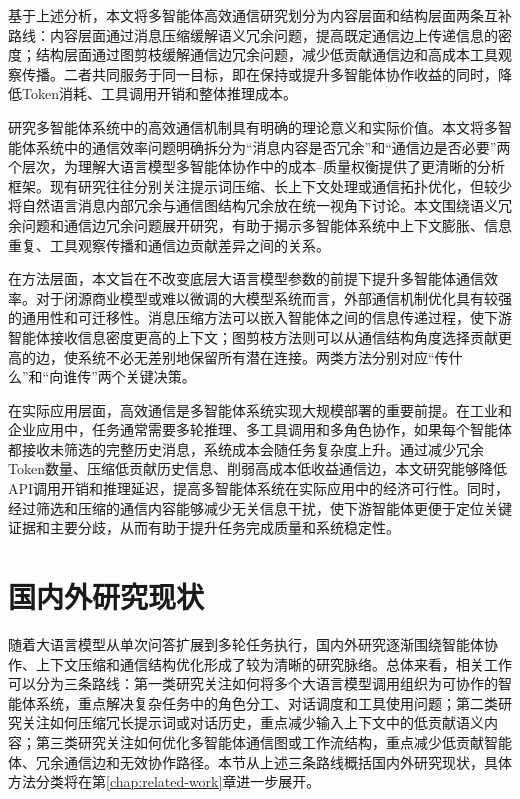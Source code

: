 基于上述分析，本文将多智能体高效通信研究划分为内容层面和结构层面两条互补路线：内容层面通过消息压缩缓解语义冗余问题，提高既定通信边上传递信息的密度；结构层面通过图剪枝缓解通信边冗余问题，减少低贡献通信边和高成本工具观察传播。二者共同服务于同一目标，即在保持或提升多智能体协作收益的同时，降低Token消耗、工具调用开销和整体推理成本。

研究多智能体系统中的高效通信机制具有明确的理论意义和实际价值。本文将多智能体系统中的通信效率问题明确拆分为“消息内容是否冗余”和“通信边是否必要”两个层次，为理解大语言模型多智能体协作中的成本--质量权衡提供了更清晰的分析框架。现有研究往往分别关注提示词压缩、长上下文处理或通信拓扑优化，但较少将自然语言消息内部冗余与通信图结构冗余放在统一视角下讨论。本文围绕语义冗余问题和通信边冗余问题展开研究，有助于揭示多智能体系统中上下文膨胀、信息重复、工具观察传播和通信边贡献差异之间的关系。

在方法层面，本文旨在不改变底层大语言模型参数的前提下提升多智能体通信效率。对于闭源商业模型或难以微调的大模型系统而言，外部通信机制优化具有较强的通用性和可迁移性。消息压缩方法可以嵌入智能体之间的信息传递过程，使下游智能体接收信息密度更高的上下文；图剪枝方法则可以从通信结构角度选择贡献更高的边，使系统不必无差别地保留所有潜在连接。两类方法分别对应“传什么”和“向谁传”两个关键决策。

在实际应用层面，高效通信是多智能体系统实现大规模部署的重要前提。在工业和企业应用中，任务通常需要多轮推理、多工具调用和多角色协作，如果每个智能体都接收未筛选的完整历史消息，系统成本会随任务复杂度上升。通过减少冗余Token数量、压缩低贡献历史信息、削弱高成本低收益通信边，本文研究能够降低API调用开销和推理延迟，提高多智能体系统在实际应用中的经济可行性。同时，经过筛选和压缩的通信内容能够减少无关信息干扰，使下游智能体更便于定位关键证据和主要分歧，从而有助于提升任务完成质量和系统稳定性。

\section{国内外研究现状}

随着大语言模型从单次问答扩展到多轮任务执行，国内外研究逐渐围绕智能体协作、上下文压缩和通信结构优化形成了较为清晰的研究脉络。总体来看，相关工作可以分为三条路线：第一类研究关注如何将多个大语言模型调用组织为可协作的智能体系统，重点解决复杂任务中的角色分工、对话调度和工具使用问题；第二类研究关注如何压缩冗长提示词或对话历史，重点减少输入上下文中的低贡献语义内容；第三类研究关注如何优化多智能体通信图或工作流结构，重点减少低贡献智能体、冗余通信边和无效协作路径。本节从上述三条路线概括国内外研究现状，具体方法分类将在第\ref{chap:related-work}章进一步展开。

